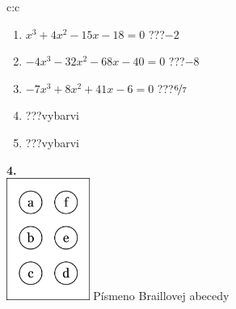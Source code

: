 \documentclass[10pt]{report}
\begin{document}
\begin{tabular}{c:c}
\begin{minipage}[c][104.5mm][t]{0.5\linewidth}
\begin{center}
\begin{minipage}{0.79\linewidth}
\begin{center}
\begin{varwidth}{\linewidth}
\begin{enumerate}
\item $x^3+4x^2-15x-18=0$\quad \dotfill\; ???\;\dotfill \quad $-2$
\item $-4x^3-32x^2-68x-40=0$\quad \dotfill\; ???\;\dotfill \quad $-8$
\item $-7x^3+8x^2+41x-6=0$\quad \dotfill\; ???\;\dotfill \quad $\nicefrac{6}{7}$
\item \quad \dotfill\; ???\;\dotfill \quad vybarvi
\item \quad \dotfill\; ???\;\dotfill \quad vybarvi
\end{enumerate}
\end{varwidth}
\end{center}
\end{minipage}
\begin{minipage}{0.20\linewidth}
\begin{center}
{\Huge\bfseries 4.} \\[2mm]
\includegraphics[height=40mm]{../images/braille.png}
{\small Písmeno Braillovej abecedy}
\end{center}
\end{minipage}
\end{center}
\end{minipage}
%
\end{tabular}
\newpage
\thispagestyle{empty}
\end{document}

